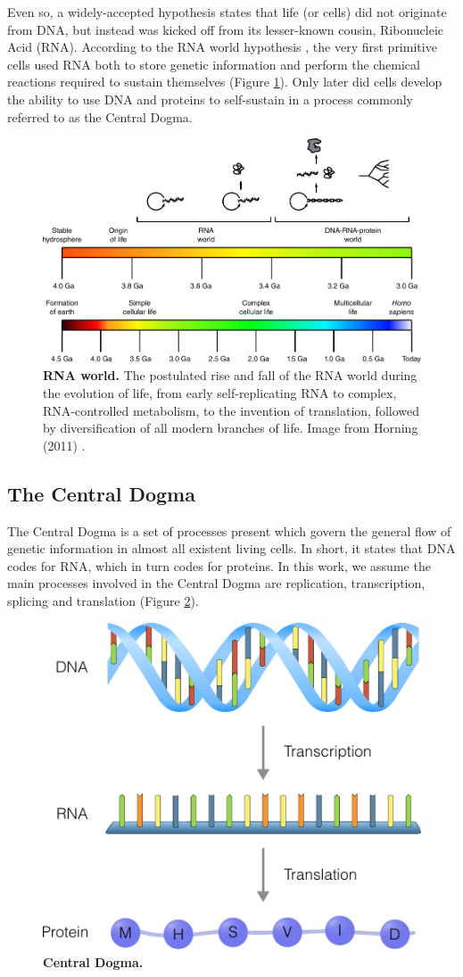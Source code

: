 Even so, a widely-accepted hypothesis states that life (or cells) did not originate from DNA, but instead was kicked off from its lesser-known cousin, Ribonucleic Acid (RNA). According to the RNA world hypothesis \cite{alberts_rnaworldorigins_2002}, the very first primitive cells used RNA both to store genetic information and perform the chemical reactions required to sustain themselves (Figure \ref{fig:rnaworld}). Only later did cells develop the ability to use DNA and proteins to self-sustain in a process commonly referred to as the Central Dogma.


\begin{figure}[htb!]
	\centering\includegraphics[width=.5\linewidth]{fig/rnaworld} %
	\caption{
		\textbf{RNA world.} The postulated rise and fall of the RNA world during the evolution of life, from early self-replicating RNA to complex, RNA-controlled metabolism, to the invention of translation, followed by diversification of all modern branches of life. Image from Horning (2011) \cite{horning_rnaworld_2011}. %
	}
	\label{fig:rnaworld}
\end{figure}

\subsection{The Central Dogma}

The Central Dogma is a set of processes present which govern the general flow of genetic information in almost all existent living cells. In short, it states that DNA codes for RNA, which in turn codes for proteins.
In this work, we assume the main processes involved in the Central Dogma are replication, transcription, splicing and translation (Figure \ref{fig:centraldogma}). 


\begin{figure}[htb!]
	\centering\includegraphics[width=.5\linewidth]{fig/central_dogma} %
	\caption{
		\textbf{Central Dogma.} %
	}
	\label{fig:centraldogma}
\end{figure}

